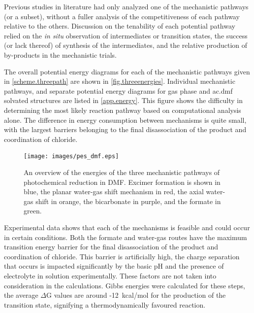 Previous studies in literature had only analyzed one of the mechanistic pathways (or a subset), without a fuller analysis of the competitiveness of each pathway relative to the others. Discussion on the tenability of each potential pathway relied on the \textit{in situ} observation of intermediates or transition states, the success (or lack thereof) of synthesis of the intermediates, and the relative production of by-products in the mechanistic trials. 

The overall potential energy diagrams for each of the mechanistic pathways given in \autoref{scheme.threepath} are shown in \autoref{fig.threeenergies}. Individual mechanistic pathways, and separate potential energy diagrams for gas phase and \gls{ac.dmf} solvated structures are listed in \autoref{app.energy}. This figure shows the difficulty in determining the most likely reaction pathway based on computational analysis alone. The difference in energy consumption between mechanisms is quite small, with the largest barriers belonging to the final disassociation of the product and coordination of chloride.

\begin{figure}[!htb]
 \begin{center}
  \texttt{[image: images/pes\_dmf.eps]}
 \end{center}
\caption[An overview of the energies of the three mechanistic pathways of photochemical  reduction in DMF.]{An overview of the energies of the three mechanistic pathways of photochemical  reduction in DMF. Excimer formation is shown in blue, the planar water-gas shift mechanism in red, the axial water-gas shift in orange, the bicarbonate in purple, and the formate in green.}
\label{fig.threeenergies}
\end{figure}  

Experimental data shows that each of the mechanisms is feasible and could occur in certain conditions. Both the formate and water-gas routes have the maximum transition energy barrier for the final disassociation of the product and coordination of chloride. This barrier is artificially high, the charge separation that occurs is impacted significantly by the basic pH and the presence of electrolyte in solution experimentally. These factors are not taken into consideration in the calculations. Gibbs energies were calculated for these steps, the average $\Delta$G values are around -12~kcal/mol for the production of the transition state, signifying a thermodynamically favoured reaction. 

